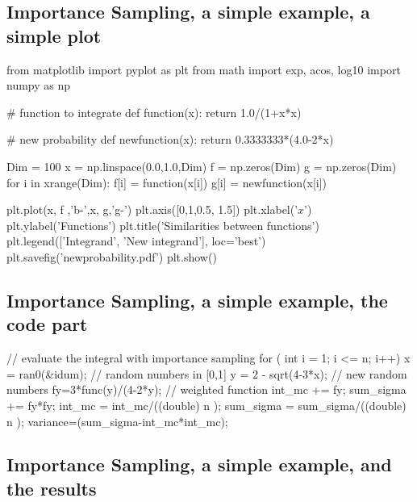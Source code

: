 \documentclass[%
oneside,                 %
final,                   %
10pt]{article}
\newenvironment{block_mdfboxadmon}[1][]{
\begin{block_mdfboxmdframed}[frametitle=#1]
}
{
\end{block_mdfboxmdframed}
}
\begin{document}
\subsection{Importance Sampling, a simple example, a simple plot}

\begin{block_mdfboxadmon}[]

\bpypro
from  matplotlib import pyplot as plt
from math import exp, acos, log10
import numpy as np

#  function to integrate                                                                                     
def function(x):
    return 1.0/(1+x*x)

#  new probability                                                                                           
def newfunction(x):
    return 0.3333333*(4.0-2*x)

Dim = 100
x = np.linspace(0.0,1.0,Dim)
f = np.zeros(Dim)
g = np.zeros(Dim)
for i in xrange(Dim):
    f[i] = function(x[i])
    g[i] = newfunction(x[i])

plt.plot(x, f ,'b-',x, g,'g-')
plt.axis([0,1,0.5, 1.5])
plt.xlabel('$x$')
plt.ylabel('Functions')
plt.title('Similarities between functions')
plt.legend(['Integrand', 'New integrand'], loc='best')
plt.savefig('newprobability.pdf')
plt.show()

\epypro
\end{block_mdfboxadmon} %





\subsection{Importance Sampling, a simple example, the code part}

\begin{block_mdfboxadmon}[]
\bcppcod
//   evaluate the integral with importance sampling
     for ( int i = 1;  i <= n; i++){
       x = ran0(&idum);  // random numbers in [0,1]
       y = 2 - sqrt(4-3*x);  // new random numbers
       fy=3*func(y)/(4-2*y); // weighted function
       int_mc += fy;
       sum_sigma += fy*fy;
     }
     int_mc = int_mc/((double) n );
     sum_sigma = sum_sigma/((double) n );
     variance=(sum_sigma-int_mc*int_mc);
\ecppcod
\end{block_mdfboxadmon} %





\subsection{Importance Sampling, a simple example, and the results}
\end{document}
